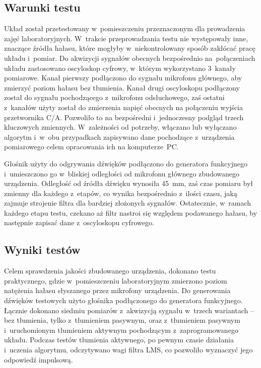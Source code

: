 \subsection{Warunki testu}
\label{subsec:circumstances}
Układ został przetestowany w~pomieszczeniu przeznaczonym dla prowadzenia zajęć laboratoryjnych. W~trakcie przeprowadzania testu nie występowały inne, znaczące źródła hałasu, które mogłyby w~niekontrolowany sposób zakłócać pracę układu i~pomiar. Do akwizycji sygnałów obecnych bezpośrednio na~połączeniach układu zastosowano oscyloskop cyfrowy, w~którym wykorzystano 3~kanały pomiarowe. Kanał pierwszy podłączono do sygnału mikrofonu głównego, aby zmierzyć poziom hałasu bez tłumienia. Kanał drugi oscyloskopu podłączony został do sygnału pochodzącego z~mikrofonu odsłuchowego, zaś ostatni z~kanałów użyty został do zmierzenia napięć obecnych na połączeniu wyjścia przetwornika C/A. Pozwoliło to na bezpośredni i~jednoczesny podgląd trzech kluczowych zmiennych. W~zależności od potrzeby, włączano lub wyłączano algorytm i~w~obu przypadkach zapisywano dane pochodzące z~urządzenia pomiarowego celem opracowania ich na komputerze~PC.

Głośnik użyty do odgrywania dźwięków podłączono do generatora funkcyjnego i~umieszczono go w~bliskiej odległości od mikrofonu głównego zbudowanego urządzenia. Odległość od źródła dźwięku wynosiła \SI{45}{\mm}, zaś czas pomiaru był zmienny dla każdego z~etapów, co wynika bezpośrednio z~ilości czasu, jaką zajmuje strojenie filtra dla bardziej złożonych sygnałów. Ostatecznie, w~ramach każdego etapu testu, czekano aż filtr nastroi się względem podawanego hałasu, by następnie zapisać dane z~oscyloskopu cyfrowego.
\subsection{Wyniki testów}
Celem sprawdzenia jakości zbudowanego urządzenia, dokonano testu praktycznego, gdzie w~pomieszczeniu laboratoryjnym zmierzono poziom natężenia hałasu słyszanego przez mikrofony urządzenia. Do generowania dźwięków testowych użyto głośnika podłączonego do generatora funkcyjnego. Łącznie dokonano siedmiu pomiarów z~akwizycją sygnału w~trzech wariantach -- bez tłumienia, tylko z~tłumieniem pasywnym, oraz z~tłumieniem pasywnym i~uruchomionym tłumieniem aktywnym pochodzącym z~zaprogramowanego układu. Podczas testów tłumienia aktywnego, po pewnym czasie działania i~uczenia algorytmu, odczytywano wagi filtra LMS, co pozwoliło wyznaczyć jego odpowiedź impulsową.

